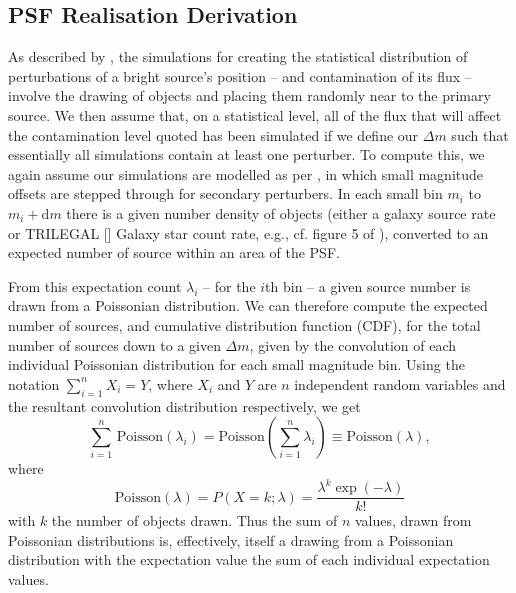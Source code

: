 \documentclass[fleqn,usenatbib]{mnras}
\begin{document}
\subsection{PSF Realisation Derivation}
As described by \citet{2018MNRAS.481.2148W}, the simulations for creating the statistical distribution of perturbations of a bright source's position -- and contamination of its flux -- involve the drawing of objects and placing them randomly near to the primary source.
We then assume that, on a statistical level, all of the flux that will affect the contamination level quoted has been simulated if we define our $\Delta m$ such that essentially all simulations contain at least one perturber.
To compute this, we again assume our simulations are modelled as per \citet{2018MNRAS.481.2148W}, in which small magnitude offsets are stepped through for secondary perturbers.
In each small bin $m_i$ to $m_i + \mathrm{d}m$ there is a given number density of objects (either a galaxy source rate or TRILEGAL [\citealp{Girardi2005}] Galaxy star count rate, e.g., cf. figure 5 of \citealp{2018MNRAS.481.2148W}), converted to an expected number of source within an area of the PSF.

From this expectation count $\lambda_i$ -- for the $i$th bin -- a given source number is drawn from a Poissonian distribution.
We can therefore compute the expected number of sources, and cumulative distribution function (CDF), for the total number of sources down to a given $\Delta m$, given by the convolution of each individual Poissonian distribution for each small magnitude bin.
Using the notation $\sum_{i=1}^n X_i = Y$, where $X_i$ and $Y$ are $n$ independent random variables and the resultant convolution distribution respectively, we get
\begin{equation}
    \sum\limits_{i=1}^n\,\mathrm{Poisson}(\lambda_i) = \mathrm{Poisson}\left(\sum\limits_{i=1}^n\lambda_i\right) \equiv \mathrm{Poisson}(\lambda),
\end{equation}
where
\begin{equation}
\mathrm{Poisson}(\lambda) = P(X = k; \lambda) = \frac{\lambda^k \exp(-\lambda)}{k!}
\end{equation}
with $k$ the number of objects drawn.
Thus the sum of $n$ values, drawn from Poissonian distributions is, effectively, itself a drawing from a Poissonian distribution with the expectation value the sum of each individual expectation values.
\end{document}
